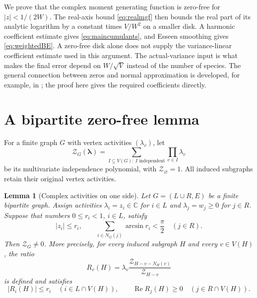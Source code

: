 \documentclass[11pt]{article}
\numberwithin{equation}{section}
\newtheorem{lemma}[theorem]{Lemma}
\theoremstyle{remark}
\newcommand{\C}{\mathbb C}
\newcommand{\calZ}{\mathcal Z}
\begin{document}
We prove that the complex moment generating function is zero-free for
$|z|<1/(2W)$. The real-axis bound \eqref{eq:realmgf} then bounds the real part
of its analytic logarithm by a constant times $V/W^2$ on a smaller disk.
A harmonic coefficient estimate gives \eqref{eq:maincumulants}, and Esseen
smoothing gives \eqref{eq:weightedBE}. A zero-free disk alone does not supply
the variance-linear coefficient estimate used in this argument. The
actual-variance input is what makes the final error depend on $W/\sqrt V$
instead of the number of species. The general connection between zeros and
normal approximation is developed, for example, in \cite{LPRS}; the proof
here gives the required coefficients directly.

\section{A bipartite zero-free lemma}\label{sec:bipartite}

For a finite graph $G$ with vertex activities $(\lambda_v)$, let
\[
 \calZ_G(\boldsymbol\lambda)
 =\sum_{I\subseteq V(G):\ I\text{ independent}}\prod_{v\in I}\lambda_v
\]
be its multivariate independence polynomial, with
$\calZ_\varnothing=1$. All induced subgraphs retain their original vertex
activities.

\begin{lemma}[Complex activities on one side]\label{lem:bipartite}
Let $G=(L\cup R,E)$ be a finite bipartite graph. Assign activities
$\lambda_i=z_i\in\C$ for $i\in L$ and $\lambda_j=w_j\ge0$ for $j\in R$.
Suppose that numbers $0\le r_i<1$, $i\in L$, satisfy
\begin{equation}\label{eq:arcsincondition}
 |z_i|\le r_i,
 \qquad \sum_{i\in N_G(j)}\arcsin r_i<\frac\pi2
 \quad(j\in R).
\end{equation}
Then $\calZ_G\ne0$. More precisely, for every induced subgraph $H$ and every
$v\in V(H)$, the ratio
\begin{equation}\label{eq:ratio}
 R_v(H)=\lambda_v
   \frac{\calZ_{H-v-N_H(v)}}{\calZ_{H-v}}
\end{equation}
is defined and satisfies
\begin{equation}\label{eq:ratiobounds}
 |R_i(H)|\le r_i\quad(i\in L\cap V(H)),
 \qquad \operatorname{Re}R_j(H)\ge0\quad(j\in R\cap V(H)).
\end{equation}
\end{lemma}
\end{document}
